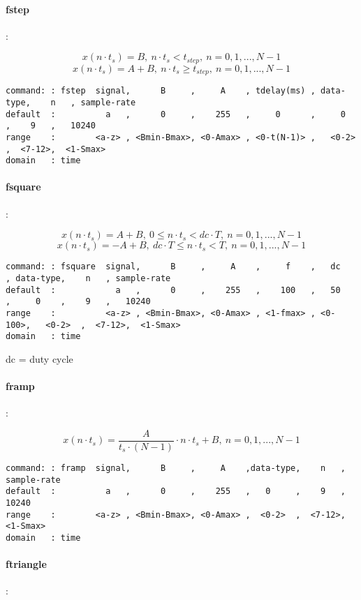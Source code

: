 \documentclass{report}
\newcommand{\bc}{\scriptsize}
\newcommand{\ec}{\normalsize}
\begin{document}
\paragraph{fstep}:

\[ x(n \cdot t_{s}) = B,~ n \cdot t_{s} < t_{step},~ n=0,1,...,N-1 \]
\[ x(n \cdot t_{s}) = A+B,~ n \cdot t_{s} \geq t_{step},~ n=0,1,...,N-1 \]

\bc
\begin{verbatim}
command: : fstep  signal,      B     ,     A    , tdelay(ms) , data-type,    n   , sample-rate
default  :          a   ,      0     ,    255   ,     0      ,     0    ,    9   ,   10240
range    :        <a-z> , <Bmin-Bmax>, <0-Amax> , <0-t(N-1)> ,   <0-2>  ,  <7-12>,  <1-Smax>
domain   : time
\end{verbatim}
\ec

\paragraph{fsquare}:

\[ x(n \cdot t_{s}) = A+B,~ 0 \leq n \cdot t_{s} < dc \cdot T,~ n=0,1,...,N-1 \]
\[ x(n \cdot t_{s}) = -A+B,~ dc \cdot T \leq n \cdot t_{s} < T,~ n=0,1,...,N-1 \]

\bc
\begin{verbatim}
command: : fsquare  signal,      B     ,     A    ,     f    ,   dc   , data-type,    n   , sample-rate
default  :            a   ,      0     ,    255   ,    100   ,   50   ,     0    ,    9   ,   10240
range    :          <a-z> , <Bmin-Bmax>, <0-Amax> , <1-fmax> , <0-100>,   <0-2>  ,  <7-12>,  <1-Smax>
domain   : time
\end{verbatim}
\ec

dc = duty cycle

\paragraph{framp}:

\[ x(n \cdot t_{s}) = \frac{A}{t_{s} \cdot (N-1)} \cdot n \cdot t_{s} + B,~ n=0,1,...,N-1 \]

\bc
\begin{verbatim}
command: : framp  signal,      B     ,     A    ,data-type,    n   , sample-rate
default  :          a   ,      0     ,    255   ,   0     ,    9   ,   10240
range    :        <a-z> , <Bmin-Bmax>, <0-Amax> ,  <0-2>  ,  <7-12>,  <1-Smax>
domain   : time
\end{verbatim}
\ec

\paragraph{ftriangle}:
\end{document}
